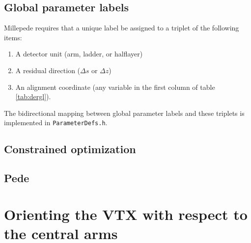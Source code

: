\documentclass[12pt]{article}
\begin{document}
\subsection{Global parameter labels}
Millepede requires that a unique label be assigned to a triplet of the following items:
\begin{enumerate}
  \item A detector unit (arm, ladder, or halflayer)
  \item A residual direction ($\Delta s$ or $\Delta z$)
  \item An alignment coordinate (any variable in the first column of table \ref{tab:dergl}).
\end{enumerate}
The bidirectional mapping between global parameter labels and these triplets is implemented in \texttt{ParameterDefs.h}.

\subsection{Constrained optimization}
\subsection{Pede}
\section{Orienting the VTX with respect to the central arms}
\end{document}
